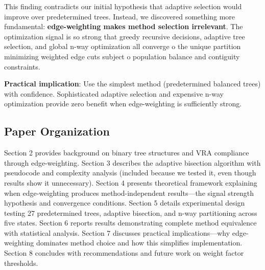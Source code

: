 This finding contradicts our initial hypothesis that adaptive selection would improve over predetermined trees. Instead, we discovered something more fundamental: \textbf{edge-weighting makes method selection irrelevant}. The optimization signal is so strong that greedy recursive decisions, adaptive tree selection, and global n-way optimization all converge 	o the unique partition minimizing weighted edge cuts subject 	o population balance and contiguity constraints.

\textbf{Practical implication}: Use the simplest method (predetermined balanced trees) with confidence. Sophisticated adaptive selection and expensive n-way optimization provide zero benefit when edge-weighting is sufficiently strong.

\subsection{Paper Organization}

Section 2 provides background on binary tree structures and VRA compliance through edge-weighting. Section 3 describes the adaptive bisection algorithm with pseudocode and complexity analysis (included because we tested it, even though results show it unnecessary). Section 4 presents theoretical framework explaining when edge-weighting produces method-independent results—the signal strength hypothesis and convergence conditions. Section 5 details experimental design testing 27 predetermined trees, adaptive bisection, and n-way partitioning across five states. Section 6 reports results demonstrating complete method equivalence with statistical analysis. Section 7 discusses practical implications—why edge-weighting dominates method choice and how this simplifies implementation. Section 8 concludes with recommendations and future work on weight factor thresholds.
